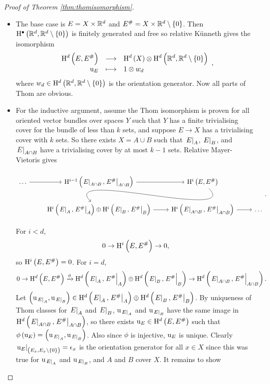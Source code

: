 \begin{proof}[Proof of Theorem \ref{thm:thomisomorphism}]
\hfill
\begin{itemize}
\item The base case is $ E = X \times \mathbb{R}^d $ and $ E^\# = X \times \RR^d \setminus \cbr{0} $. Then $ \H^\bullet\br{\RR^d, \RR^d \setminus \cbr{0}} $ is finitely generated and free so relative K\"unneth gives the isomorphism
$$ \function{\H^d\br{E, E^\#}}{\H^d\br{X} \otimes \H^d\br{\RR^d, \RR^d \setminus \cbr{0}}}{\u_E}{1 \otimes w_d}, $$
where $ w_d \in \H^d\br{\RR^d, \RR^d \setminus \cbr{0}} $ is the orientation generator. Now all parts of Thom are obvious.
\item For the inductive argument, assume the Thom isomorphism is proven for all oriented vector bundles over spaces $ Y $ such that $ Y $ has a finite trivialising cover for the bundle of less than $ k $ sets, and suppose $ E \to X $ has a trivialising cover with $ k $ sets. So there exists $ X = A \cup B $ such that $ \left. E \right|_A $, $ \left. E \right|_B $, and $ \left. E \right|_{A \cap B} $ have a trivialising cover by at most $ k - 1 $ sets. Relative Mayer-Vietoris gives
$$
\begin{tikzcd}
\dots \arrow{r} & \H^{i - 1}\br{\eval{E}_{A \cap B}, \eval{E^\#}_{A \cap B}} \arrow{r} & \H^i\br{E, E^\#} \arrow[in=135, out=-45]{dl} & \\
& \H^i\br{\eval{E}_A, \eval{E^\#}_A} \oplus \H^i\br{\eval{E}_B, \eval{E^\#}_B} \arrow{r} & \H^i\br{\eval{E}_{A \cap B}, \eval{E^\#}_{A \cap B}} \arrow{r} & \dots
\end{tikzcd}.
$$
For $ i < d $,
$$ 0 \to \H^i\br{E, E^\#} \to 0, $$
so $ \H^i\br{E, E^\#} = 0 $. For $ i = d $,
$$ 0 \to \H^d\br{E, E^\#} \xrightarrow{\phi} \H^d\br{\eval{E}_A, \eval{E^\#}_A} \oplus \H^d\br{\eval{E}_B, \eval{E^\#}_B} \to \H^d\br{\eval{E}_{A \cap B}, \eval{E^\#}_{A \cap B}}. $$
Let $ \br{\u_{\eval{E}_A}, \u_{\eval{E}_B}} \in \H^d\br{\eval{E}_A, \eval{E^\#}_A} \oplus \H^d\br{\eval{E}_B, \eval{E^\#}_B} $. By uniqueness of Thom classes for $ \left. E \right|_A $ and $ \left. E \right|_B $, $ \mathrm{u}_{\left. E \right|_A} $ and $ \mathrm{u}_{\left. E \right|_B} $ have the same image in $ \H^d\br{\eval{E}_{A \cap B}, \eval{E^\#}_{A \cap B}} $, so there exists $ \u_E \in \H^d\br{E, E^\#} $ such that $ \phi\br{\u_E} = \br{\u_{\eval{E}_A}, \u_{\eval{E}_B}} $. Also since $ \phi $ is injective, $ \mathrm{u}_E $ is unique. Clearly $ \eval{\u_E}_{\br{E_x, E_x \setminus \cbr{0}}} = \epsilon_x $ is the orientation generator for all $ x \in X $ since this was true for $ \mathrm{u}_{\left. E \right|_A} $ and $ \mathrm{u}_{\left. E \right|_B} $, and $ A $ and $ B $ cover $ X $. It remains to show

\end{itemize}
\end{proof}
